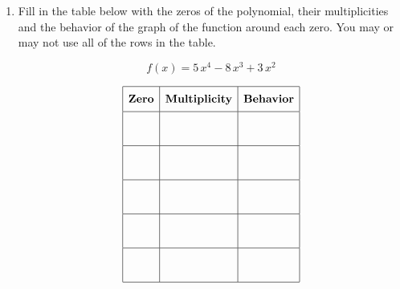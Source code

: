 \documentclass[11pt]{article}
\begin{document}
\begin{enumerate}
{{}
}

\newpage

% 

\item %
\providecommand{\stxKnowl}{}\renewcommand{\stxKnowl}[1]{#1}
\providecommand{\stxOuttro}{}\renewcommand{\stxOuttro}[1]{#1}
\providecommand{\stxTitle}{}\renewcommand{\stxTitle}[1]{#1}
\renewcommand{\stxOuttro}[1]{}
\stxKnowl{
Fill in the table below with the zeros of the polynomial, their multiplicities and the behavior of the graph of the function around each zero. You may or may not use all of the rows in the table.

\[f(x) = 5 \, x^{4} - 8 \, x^{3} + 3 \, x^{2}\]

 \[\begin{array}{|c|c|c|} \hline \rule[-0.8em]{0pt}{2.2em} \textbf{Zero} & \textbf{Multiplicity} & \textbf{Behavior} \\ \hline \rule[-1.2em]{0pt}{3em} & & \\ \hline \rule[-1.2em]{0pt}{3em} & & \\ \hline \rule[-1.2em]{0pt}{3em} & & \\ \hline \rule[-1.2em]{0pt}{3em} & & \\ \hline \rule[-1.2em]{0pt}{3em} & & \\ \hline \end{array}\] 

\stxOuttro{
Solution

\[\begin{aligned} f(x) &= 5 \, x^{4} - 8 \, x^{3} + 3 \, x^{2} \\ &= x^2(5 \, x^{2} - 8 \, x + 3) \\ &= x^2(5x - 3)(x - 1) \end{aligned}\]

 \[\begin{array}{|c|c|c|} \hline \rule[-0.8em]{0pt}{2.2em} \textbf{Zero} & \textbf{Multiplicity} & \textbf{Behavior} \\ \hline \rule[-1.2em]{0pt}{3em} 0 & 2 & \text{bounce} \\ \hline \rule[-1.2em]{0pt}{3em} \frac{3}{5} & 1 & \text{cross} \\ \hline \rule[-1.2em]{0pt}{3em} 1 & 1 & \text{cross} \\ \hline \rule[-1.2em]{0pt}{3em} & & \\ \hline \rule[-1.2em]{0pt}{3em} & & \\ \hline \end{array}\] 

}}
\end{enumerate}
\end{document}
